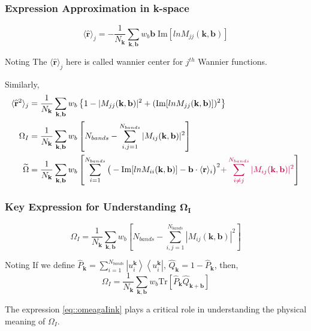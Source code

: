 \documentclass{beamer}
\begin{document}
  \begin{frame}
    \small
    \frametitle{Expression Approximation in k-space}
    \begin{equation*}
        \langle\widehat{\mathbf{r}}\rangle_j = -\dfrac{1}{N_\mathbf{k}}\sum_{\mathbf{k},\mathbf{b}}w_b\mathbf{b}\;\mathrm{Im}[lnM_{jj}(\mathbf{k}, \mathbf{b})]
    \end{equation*}
    \begin{block}{Noting}
      The \(\langle\widehat{\mathbf{r}}\rangle_j\) here is called wannier center for \(j^{th}\) Wannier functions. 
    \end{block}

    Similarly, 
    \begin{subequations}
      \begin{align}
        \langle\widehat{\mathbf{r}}^2\rangle_j &= \dfrac{1}{N_\mathbf{k}}\sum_{\mathbf{k},\mathbf{b}}w_b\left\{1-|M_{jj}(\mathbf{k},\mathbf{b})|^2+(\mathrm{Im}[lnM_{jj}(\mathbf{k},\mathbf{b})])^2\right\}\\
        \Omega_I &= \dfrac{1}{N_\mathbf{k}}\sum_{\mathbf{k},\mathbf{b}}w_b\left[N_{bands} - \sum_{i,j=1}^{N_{bands}}|M_{ij}(\mathbf{k},\mathbf{b})|^2\right]\\
        \widetilde{\Omega} &= \dfrac{1}{N_\mathbf{k}}\sum_{\mathbf{k},\mathbf{b}}w_b\left[{\color{black}\sum_{i=1}^{N_{bands}}\big(-\mathrm{Im}[lnM_{ii}(\mathbf{k},\mathbf{b})]-\mathbf{b}\cdot\langle\mathbf{r}\rangle_i\big)^2}{\color{purple}+\sum_{i\ne{}j}^{N_{bands}}|M_{ij}(\mathbf{k},\mathbf{b})|^2}\right]
      \end{align}
    \end{subequations}
  \end{frame}

  \begin{frame}
    \frametitle{Key Expression for Understanding \(\mathbf{\Omega_I}\)}
    \begin{equation*}
      \Omega_I = \dfrac{1}{N_\mathbf{k}}\sum_{\mathbf{k},\mathbf{b}}w_b\left[N_{bands} - \sum_{i,j=1}^{N_{bands}}|M_{ij}(\mathbf{k},\mathbf{b})|^2\right]
    \end{equation*}
    \begin{block}{Noting}
      If we define \(\widehat{P}_{\mathbf{k}} = \sum_{i=1}^{N_{bands}}\left|{}u_i^{\mathbf{k}}\right\rangle\left\langle{}u_i^{\mathbf{k}}\right|\), \(\widehat{Q}_{\mathbf{k}} = 1 - \widehat{P}_{\mathbf{k}}\), then, 
      \begin{equation}
        \label{eq::omeagaIink}
        \Omega_I = \dfrac{1}{N_\mathbf{k}}\sum_{\mathbf{k},\mathbf{b}}w_b{}\mathrm{Tr}\left[\widehat{P}_{\mathbf{k}}\widehat{Q}_{\mathbf{k}+\mathbf{b}} \right]
      \end{equation}

      The expression \eqref{eq::omeagaIink} plays a critical role in understanding the physical meaning of \(\Omega_I\).
    \end{block}
  \end{frame}
\end{document}
